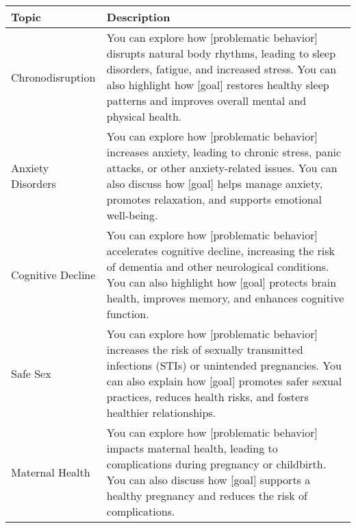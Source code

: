 \begin{table*}[tb]
\centering
\begin{tabularx}{\textwidth}{lX}
\toprule
Topic            & Description                                            \\ \midrule
Chronodisruption            & You can explore how [problematic behavior] disrupts natural body rhythms, leading to sleep disorders, fatigue, and increased stress. You can also highlight how [goal] restores healthy sleep patterns and improves overall mental and physical health.                                                                                                                                                                            \\ \hline
Anxiety Disorders           & You can explore how [problematic behavior] increases anxiety, leading to chronic stress, panic attacks, or other anxiety-related issues. You can also discuss how [goal] helps manage anxiety, promotes relaxation, and supports emotional well-being.                                                                                                                                                                             \\ \hline
Cognitive Decline           & You can explore how [problematic behavior] accelerates cognitive decline, increasing the risk of dementia and other neurological conditions. You can also highlight how [goal] protects brain health, improves memory, and enhances cognitive function.                                                                                                                                                                            \\ \hline
Safe Sex                    & You can explore how [problematic behavior] increases the risk of sexually transmitted infections (STIs) or unintended pregnancies. You can also explain how [goal] promotes safer sexual practices, reduces health risks, and fosters healthier relationships.                                                                                                                                                                     \\ \hline
Maternal Health             & You can explore how [problematic behavior] impacts maternal health, leading to complications during pregnancy or childbirth. You can also discuss how [goal] supports a healthy pregnancy and reduces the risk of complications.                                                                                                                                                                                                   \\ \hline

\end{tabularx}
\end{table*}

